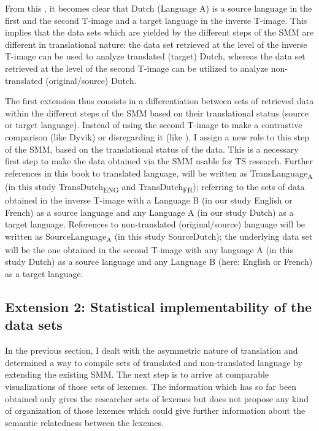 From this , it becomes clear that Dutch (Language A) is a source language in the first and the second T-image and a target language in the inverse T-image. This implies that the data sets which are yielded by the different steps of the SMM are different in translational nature: the data set retrieved at the level of the inverse T-image can be used to analyze translated (target) Dutch, whereas the data set retrieved at the level of the second T-image can be utilized to analyze non-translated (original\slash source) Dutch.

The first extension thus consists in a differentiation between sets of retrieved data within the different steps of the SMM based on their translational status (source or target language). Instead of using the second T-image to make a contrastive comparison (like Dyvik) or disregarding it (like \citealt{aijmer_model_2004}), I assign a new role to this step of the SMM, based on the translational status of the data. This is a necessary first step to make the data obtained via the SMM usable for TS research. Further references in this book to translated language, will be written as TransLanguage\textsubscript{A} (in this study TransDutch\textsubscript{ENG} and TransDutch\textsubscript{FR}); referring to the sets of data obtained in the inverse T-image with a Language B (in our study English or French) as a source language and any Language A (in our study Dutch) as a target language. References to non-translated (original\slash source) language will be written as SourceLanguage\textsubscript{A} (in this study SourceDutch); the underlying data set will be the one obtained in the second T-image with any language A (in this study Dutch) as a source language and any Language B (here: English or French) as a target language.

\subsection{Extension 2: Statistical implementability of the data sets}
\label{sec:3.5.2}
In the previous section, I dealt with the asymmetric nature of translation and determined a way to compile sets of translated and non-translated language by extending the existing SMM. The next step is to arrive at comparable visualizations of those sets of lexemes. The information which has so far been obtained only gives the researcher sets of lexemes but does not propose any kind of organization of those lexemes which could give further information about the semantic relatedness between the lexemes.

